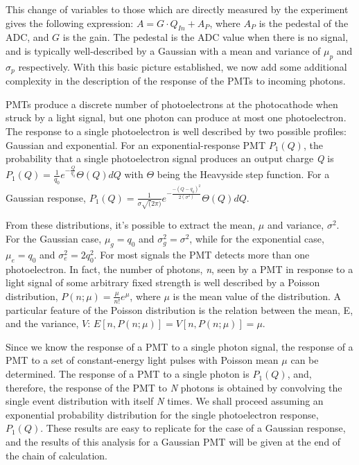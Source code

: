 This change of variables to those which are directly measured by the experiment gives the following expression: $A = G \cdot Q_{In} + A_{P}$, where $A_{P}$ is the pedestal of the ADC, and $G$ is the gain. The pedestal is the ADC value when there is no signal, and is typically well-described by a Gaussian with a mean and variance of $\mu_{p}$ and $\sigma_{p} $ respectively. With this basic picture established, we now add some additional complexity in the description of the response of the PMTs to incoming photons. 

PMTs produce a discrete number of photoelectrons at the photocathode when struck by a light signal, but one photon can produce at most one photoelectron. The response to a single photoelectron is well described by two possible profiles: Gaussian and exponential. For an exponential-response PMT $P_1(Q)$, the probability that a single photoelectron signal produces an output charge {\it Q} is $P_1(Q) = \frac{1}{q_0}e^{-\frac{Q}{q_0}} \Theta(Q)dQ$ with $\Theta$ being the Heavyside step function. For a Gaussian response, $P_1(Q) = \frac{1}{\sigma \sqrt(2\pi)}e^{-\frac{-(Q-q_0)^2}{2(\sigma^2)}} \Theta(Q)dQ$.

From these distributions, it's possible to extract the mean, $\mu$ and variance, $\sigma^2$. For the Gaussian case, $\mu_g = q_0$ and $\sigma_g^2 = \sigma^2$, while for the exponential case,   $\mu_e = q_0$ and $\sigma^2_e = 2q_0^2$.  For most signals the PMT detects more than one photoelectron. In fact, the number of photons, {\it n}, seen by a PMT in response to a  light signal of some arbitrary fixed strength is well described by a Poisson distribution, $P(n;\mu) = \frac{\mu}{n!}e^{\mu}$,  where $\mu$ is the mean value of the distribution. A particular feature of the Poisson distribution is the relation between the mean, E, and the variance, $V$:  $E[n, P(n; \mu)] = V[n, P(n;\mu)] = \mu$. 

Since we know the response of a PMT to a single photon signal, the response of a PMT to a set of constant-energy light pulses with Poisson mean $\mu$ can be determined. The response of a PMT to a single photon is $P_1(Q)$, and, therefore, the response of the PMT to {\it N} photons is obtained by convolving the single event distribution with itself  {\it N} times. We shall proceed assuming an exponential probability distribution for the single photoelectron response, $P_1(Q)$. These results are easy to replicate for the case of a Gaussian response, and the results of this analysis for a Gaussian PMT will be given at the end of the chain of calculation.  


